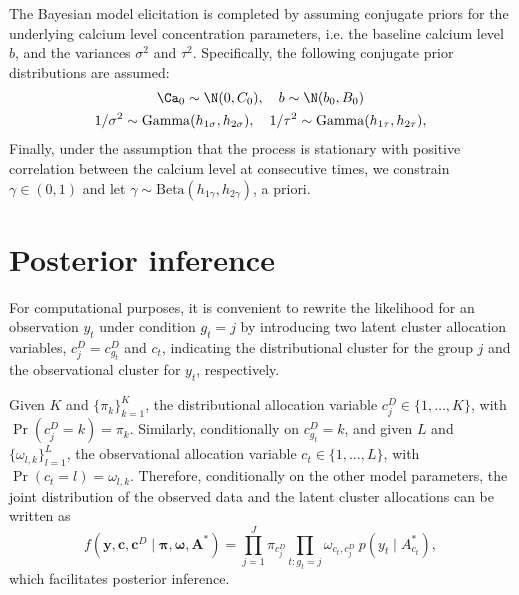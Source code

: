 The Bayesian model elicitation is completed by assuming conjugate priors for the underlying calcium level concentration parameters, i.e. the baseline calcium level $b$, and the variances $\sigma^2$ and $\tau^2$.  Specifically, the following conjugate prior distributions are assumed:
\begin{equation}
\begin{gathered}
	\Ca_0 \sim \N(0,C_0), \quad b\sim \N(b_0,B_0) \\ 
	1/\sigma^2 \sim \mathrm{Gamma}(h_{1\sigma},h_{2\sigma}),\quad 
	1/\tau^2 \sim \mathrm{Gamma}(h_{1\tau},h_{2\tau}),
\end{gathered}
\label{eq:ch3_priors}
\end{equation}
Finally, under the assumption that the process is stationary with positive correlation between the calcium level at consecutive times, we constrain $\gamma \in (0,1)$ and let $\gamma\sim \mathrm{Beta}(h_{1\gamma}, h_{2\gamma})$, a priori.



\section{Posterior inference}
\label{s:posterior_inference}

For computational purposes, it is convenient to rewrite the likelihood for an observation $y_t$ under condition $g_t=j$ by introducing two latent cluster allocation variables, $c^D_j = c^D_{g_t}$ and $c_t$, indicating the distributional cluster for the group $j$ and the observational cluster for $y_t$, respectively. 

Given $K$ and $\{\pi_k\}_{k=1}^K$, the distributional allocation variable $c^D_j\in\{1,\dots,K\}$, with $\Pr(c^D_j = k) = \pi_k$. Similarly, conditionally on $c^D_{g_t} =k$, and given $L$ and $\{\omega_{l,k}\}_{l=1}^L$, the observational allocation variable $c_t \in \{1,\dots,L\}$, with $\Pr(c_t = l) = \omega_{l,k}$. 
Therefore, conditionally on the other model parameters, the joint distribution of the observed data and the latent cluster allocations can be written as
\begin{equation*}
f(\bm{y},\bm{c},\bm{c}^D\mid \bm{\pi}, \bm{\omega}, \bm{A}^*) = \prod_{j=1}^J \pi_{c^D_j} \prod_{t:g_t = j} \omega_{c_t,c^D_j}\: p(y_t\mid A^*_{c_t}),
\end{equation*}
which facilitates posterior inference. 

